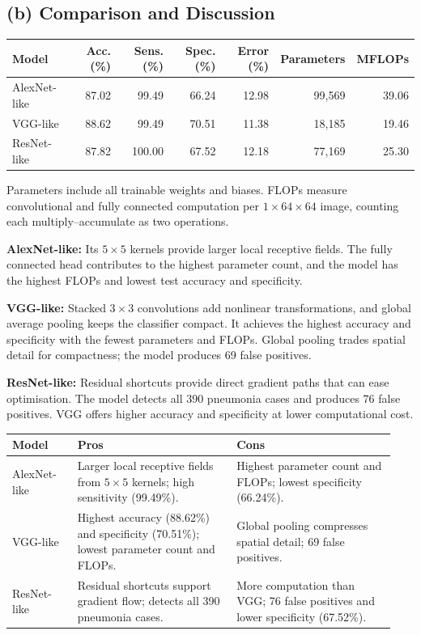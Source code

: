 \documentclass[10pt,a4paper]{article}
\begin{document}
\subsection*{(b) Comparison and Discussion}
\begin{center}\small
\begin{tabular}{lrrrrrr}\toprule
Model & Acc. (\%) & Sens. (\%) & Spec. (\%) & Error (\%) & Parameters & MFLOPs\\\midrule
AlexNet-like & 87.02 & 99.49 & 66.24 & 12.98 & 99,569 & 39.06 \\
VGG-like & 88.62 & 99.49 & 70.51 & 11.38 & 18,185 & 19.46 \\
ResNet-like & 87.82 & 100.00 & 67.52 & 12.18 & 77,169 & 25.30 \\
\bottomrule\end{tabular}\end{center}
Parameters include all trainable weights and biases. FLOPs measure convolutional and fully connected computation per $1\times64\times64$ image, counting each multiply--accumulate as two operations.

\textbf{AlexNet-like:} Its $5\times5$ kernels provide larger local receptive fields. The fully connected head contributes to the highest parameter count, and the model has the highest FLOPs and lowest test accuracy and specificity.

\textbf{VGG-like:} Stacked $3\times3$ convolutions add nonlinear transformations, and global average pooling keeps the classifier compact. It achieves the highest accuracy and specificity with the fewest parameters and FLOPs. Global pooling trades spatial detail for compactness; the model produces 69 false positives.

\textbf{ResNet-like:} Residual shortcuts provide direct gradient paths that can ease optimisation. The model detects all 390 pneumonia cases and produces 76 false positives. VGG offers higher accuracy and specificity at lower computational cost.

\begin{center}\small
\begin{tabular}{@{}p{0.16\linewidth}p{0.39\linewidth}p{0.39\linewidth}@{}}\toprule
Model & Pros & Cons\\\midrule
AlexNet-like & Larger local receptive fields from $5\times5$ kernels; high sensitivity (99.49\%). & Highest parameter count and FLOPs; lowest specificity (66.24\%).\\[3pt]
VGG-like & Highest accuracy (88.62\%) and specificity (70.51\%); lowest parameter count and FLOPs. & Global pooling compresses spatial detail; 69 false positives.\\[3pt]
ResNet-like & Residual shortcuts support gradient flow; detects all 390 pneumonia cases. & More computation than VGG; 76 false positives and lower specificity (67.52\%).\\\bottomrule
\end{tabular}\end{center}
\end{document}
